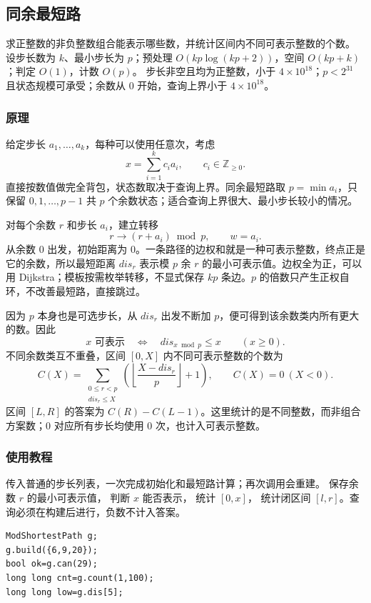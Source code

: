 \subsection{同余最短路}
\label{algo:mod-shortest-path}
\AlgorithmInfo
    {求正整数的非负整数组合能表示哪些数，并统计区间内不同可表示整数的个数。}
    {设步长数为 $k$、最小步长为 $p$；预处理 $O(kp\log(kp+2))$，空间 $O(kp+k)$；判定 $O(1)$，计数 $O(p)$。}
    {步长非空且均为正整数，小于 $4\times10^{18}$；$p<2^{31}$ 且状态规模可承受；余数从 0 开始，查询上界小于 $4\times10^{18}$。}

\subsubsection*{原理}
给定步长 $a_1,\ldots,a_k$，每种可以使用任意次，考虑
\[
    x=\sum_{i=1}^k c_i a_i,\qquad c_i\in\mathbb Z_{\ge0}.
\]
直接按数值做完全背包，状态数取决于查询上界。同余最短路取 $p=\min a_i$，只保留 $0,1,\ldots,p-1$ 共 $p$ 个余数状态；适合查询上界很大、最小步长较小的情况。

对每个余数 $r$ 和步长 $a_i$，建立转移
\[
    r\longrightarrow(r+a_i)\bmod p,\qquad w=a_i.
\]
从余数 0 出发，初始距离为 0。一条路径的边权和就是一种可表示整数，终点正是它的余数，所以最短距离 $dis_r$ 表示模 $p$ 余 $r$ 的最小可表示值。边权全为正，可以用 Dijkstra；模板按需枚举转移，不显式保存 $kp$ 条边。$p$ 的倍数只产生正权自环，不改善最短路，直接跳过。

因为 $p$ 本身也是可选步长，从 $dis_r$ 出发不断加 $p$，便可得到该余数类内所有更大的数。因此
\[
    x\text{ 可表示}\quad\Longleftrightarrow\quad
    dis_{x\bmod p}\le x\qquad(x\ge0).
\]
不同余数类互不重叠，区间 $[0,X]$ 内不同可表示整数的个数为
\[
    C(X)=\sum_{\substack{0\le r<p\\dis_r\le X}}
    \left(\left\lfloor\frac{X-dis_r}{p}\right\rfloor+1\right),
    \qquad C(X)=0\ (X<0).
\]
区间 $[L,R]$ 的答案为 $C(R)-C(L-1)$。这里统计的是不同整数，而非组合方案数；0 对应所有步长均使用 0 次，也计入可表示整数。

\subsubsection*{使用教程}
 传入普通的步长列表，一次完成初始化和最短路计算；再次调用会重建。 保存余数 $r$ 的最小可表示值， 判断 $x$ 能否表示， 统计 $[0,x]$， 统计闭区间 $[l,r]$。查询必须在构建后进行，负数不计入答案。
\begin{lstlisting}[style=mtycpp,numbers=none]
ModShortestPath g;
g.build({6,9,20});
bool ok=g.can(29);
long long cnt=g.count(1,100);
long long low=g.dis[5];
\end{lstlisting}


